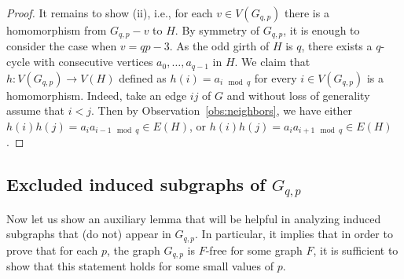 \documentclass[11pt,a4paper]{article}
\theoremstyle{mystyle}
\begin{document}
\begin{proof}
    It remains to show (ii), i.e., for each $v \in V(G_{q,p})$ there is a homomorphism from $G_{q,p} - v$ to $H$.
    By symmetry of $G_{q,p}$, it is enough to consider the case when $v=qp-3$.
    As the odd girth of $H$ is $q$, there exists a $q$-cycle with consecutive vertices $a_0,\ldots,a_{q-1}$ in $H$.
    We claim that $h:V(G_{q,p}) \to V(H)$ defined as $h(i)=a_{i \mod q}$ for every $i \in V(G_{q,p})$ is a homomorphism.
    Indeed, take an edge $ij$ of $G$ and without loss of generality assume that $i<j$.
    Then by Observation~\ref{obs:neighbors}, we have either $h(i)h(j)=a_ia_{i-1 \mod q} \in E(H)$,
    or $h(i)h(j)=a_ia_{i+1 \mod q} \in E(H)$.
\end{proof}

\subsection{Excluded induced subgraphs of $G_{q,p}$}

Now let us show an auxiliary lemma that will be helpful in analyzing induced subgraphs that (do not) appear in $G_{q,p}$.
In particular, it implies that in order to prove that for each $p$, the graph $G_{q,p}$ is $F$-free for some graph $F$,
it is sufficient to show that this statement holds for some small values of $p$.
\end{document}
